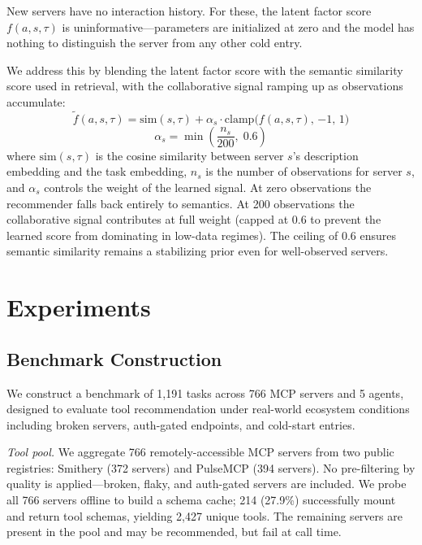 \documentclass{article} %
\begin{document}
New servers have no interaction history. For these, the latent factor score $f(a, s, \tau)$ is uninformative---parameters are initialized at zero and the model has nothing to distinguish the server from any other cold entry.

We address this by blending the latent factor score with the semantic similarity score used in retrieval, with the collaborative signal ramping up as observations accumulate:
\begin{equation}
\label{eq:blend}
\tilde{f}(a, s, \tau) = \text{sim}(s, \tau) + \alpha_s \cdot \text{clamp}\!\big(f(a, s, \tau),\, {-1},\, 1\big)
\end{equation}
\begin{equation}
\label{eq:alpha}
\alpha_s = \min\!\left(\frac{n_s}{200},\; 0.6\right)
\end{equation}
where $\text{sim}(s, \tau)$ is the cosine similarity between server $s$'s description embedding and the task embedding, $n_s$ is the number of observations for server $s$, and $\alpha_s$ controls the weight of the learned signal. At zero observations the recommender falls back entirely to semantics. At 200 observations the collaborative signal contributes at full weight (capped at 0.6 to prevent the learned score from dominating in low-data regimes). The ceiling of 0.6 ensures semantic similarity remains a stabilizing prior even for well-observed servers.

\section{Experiments}
\label{sec:experiments}

\subsection{Benchmark Construction}
\label{sec:benchmark}

We construct a benchmark of 1{,}191 tasks across 766 MCP servers and 5 agents, designed to evaluate tool recommendation under real-world ecosystem conditions including broken servers, auth-gated endpoints, and cold-start entries.

\textit{Tool pool.} We aggregate 766 remotely-accessible MCP servers from two public registries: Smithery (372 servers) and PulseMCP (394 servers). No pre-filtering by quality is applied---broken, flaky, and auth-gated servers are included. We probe all 766 servers offline to build a schema cache; 214 (27.9\%) successfully mount and return tool schemas, yielding 2{,}427 unique tools. The remaining servers are present in the pool and may be recommended, but fail at call time.
\end{document}
